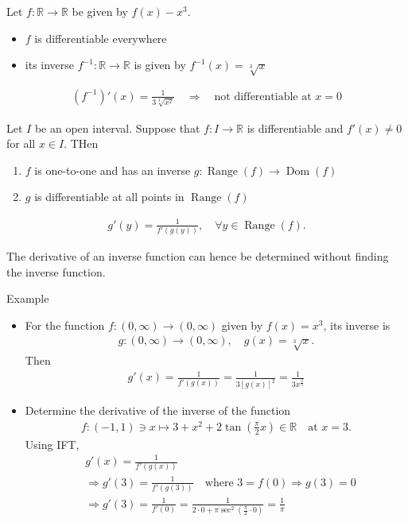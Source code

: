 \documentclass{report}
\begin{document}
		Let $f:\mathbb{R} \to \mathbb{R}$ be given by $f(x) - x^3$.
		\begin{itemize}
			\item $f$ is differentiable everywhere
			\item its inverse $f^{-1}:\mathbb{R} \to \mathbb{R}$ is given by $f^{-1}(x) = \sqrt[3]{x}$
		\end{itemize}
		\begin{align*}
			\left(f^{-1}\right)'(x) = \frac{1}{3 \sqrt[3]{x^2}} \quad \Longrightarrow \quad \text{not differentiable at } x = 0
		\end{align*}

		Let $I$ be an open interval. Suppose that $f:I \to \mathbb{R}$ is differentiable and $f'(x) \neq 0$ for all $x \in I$. THen
			\begin{enumerate}
				\item $f$ is one-to-one and has an inverse $g: \operatorname{Range}(f) \to \operatorname{Dom}(f)$
				\item $g$ is differentiable at all points in $\operatorname{Range}(f)$
			\end{enumerate}
			\begin{align*}
				g'(y) = \frac{1}{f'(g(y))}, \quad \forall y \in \operatorname{Range}(f).
			\end{align*}

			The derivative of an inverse function can hence be determined without finding the inverse function.

			\begin{question}{Example}
				\begin{itemize}
					\item For the function $f:(0, \infty) \to (0, \infty)$ given by $f(x) = x^3$, its inverse is
						\begin{align*}
							g: (0, \infty) \to (0, \infty), \quad g(x) = \sqrt[3]{x}.
						\end{align*}
						Then
						\begin{align*}
							g'(x) = \frac{1}{f'(g(x))} = \frac{1}{3[g(x)]^2} = \frac{1}{3x^{\frac{2}{3}}}
						\end{align*}
					\item Determine the derivative of the inverse of the function
						\begin{align*}
							f: (-1, 1) \ni x \mapsto 3 + x^2 + 2 \tan(\frac{\pi}{2} x) \in \mathbb{R} \quad \text{at } x = 3.
						\end{align*}
						Using IFT,
						\begin{align*}
							&g'(x) = \frac{1}{f'(g(x))}	\\
							& \Rightarrow g'(3) = \frac{1}{f'(g(3))} \quad \text{where } 3 = f(0) \Rightarrow g(3) = 0	\\
							& \Rightarrow g'(3) = \frac{1}{f'(0)} = \frac{1}{2 \cdot 0 + \pi \sec^2(\frac{\pi}{2} \cdot 0)} = \frac{1}{\pi}
						\end{align*}
				\end{itemize}
			\end{question}
\end{document}
